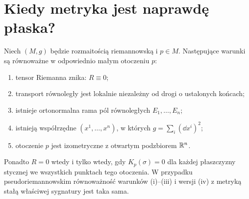 \section{Kiedy metryka jest naprawdę płaska?}

\begin{twierdzenie}
\label{thm:lokalna-plaskosc}
Niech $(M,g)$ będzie rozmaitością riemannowską
i $p\in M$. Następujące warunki są równoważne
w odpowiednio małym otoczeniu $p$:
\begin{enumerate}[label=\textup{(\roman*)}]
 \item tensor Riemanna znika: $R\equiv0$;
 \item transport równoległy jest lokalnie niezależny
       od drogi o ustalonych końcach;
 \item istnieje ortonormalna rama pól równoległych
       $E_1,\ldots,E_n$;
 \item istnieją współrzędne $(x^1,\ldots,x^n)$,
       w których $g=\sum_i(\dd x^i)^2$;
 \item otoczenie $p$ jest izometryczne z otwartym
       podzbiorem $\mathbb{R}^n$.
\end{enumerate}
Ponadto $R=0$ wtedy i tylko wtedy, gdy
$K_p(\sigma)=0$ dla każdej płaszczyzny stycznej
we wszystkich punktach tego otoczenia.
W przypadku pseudoriemannowskim równoważność
warunków \textup{(i)--(iii)} i wersji \textup{(iv)}
z metryką stałą właściwej sygnatury jest taka sama.
\end{twierdzenie}

